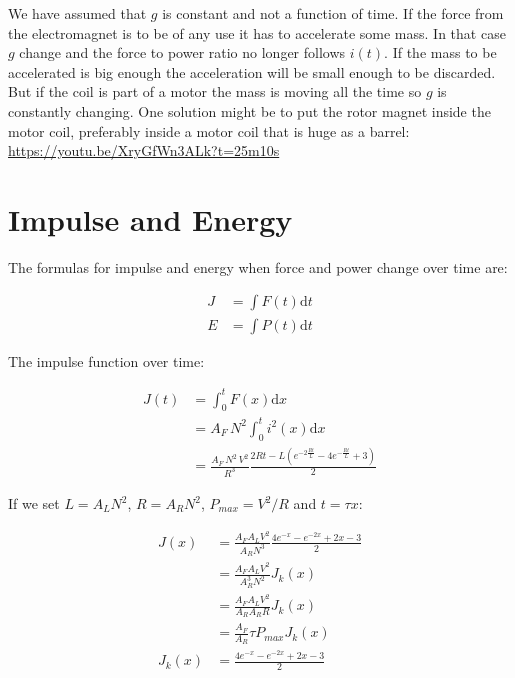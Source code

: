 \documentclass[]{../common/elementary-physics}
\begin{document}
We have assumed that $g$ is constant and not a function of time.
If the force from the electromagnet is to be of any use it has to accelerate some mass.
In that case $g$ change and the force to power ratio no longer follows $i(t)$.
If the mass to be accelerated is big enough the acceleration will be small enough to be discarded.
But if the coil is part of a motor the mass is moving all the time so $g$ is constantly changing.
One solution might be to put the rotor magnet inside the motor coil, preferably inside a motor coil that is huge as a barrel\cite{jonew}: \url{https://youtu.be/XryGfWn3ALk?t=25m10s}

\section{Impulse and Energy}

The formulas for impulse and energy when force and power change over time are:

\begin{subequations}
\begin{align}
J &= \int F(t) \mathrm{d}t \\
E &= \int P(t) \mathrm{d}t
\end{align}
\end{subequations}

The impulse function over time:

\begin{subequations}
\begin{align}
J(t) &= \int^t_0 F(x) \mathrm{d}x \\
&= A_F \, N^2 \int^t_0 i^2(x) \mathrm{d}x \\
&= \frac{A_F \, N^2 \, V^2}{R^3} \frac{2 R t - L (e^{-2 \frac{R t}{L}} - 4 e^{-\frac{R t}{L}} + 3)}{2}
\end{align}
\end{subequations}

If we set $L = A_L N^2$, $R = A_R N^2$, $P_{max} = V^2 / R$ and  $t = \tau x$:

\begin{subequations}
\begin{align}
J(x) &= \frac{A_F A_L V^2}{A_R N^3} \frac{4 e^{-x}-e^{-2x}+2x-3}{2} \\
&= \frac{A_F A_L V^2}{A_R^3 N^2} J_k(x) \\
&= \frac{A_F A_L V^2}{A_R A_R R} J_k(x) \\
&= \frac{A_F}{A_R} \tau P_{max} J_k(x) \\
J_k(x) &= \frac{4 e^{-x}-e^{-2x}+2x-3}{2}
\end{align}
\end{subequations}
\end{document}
